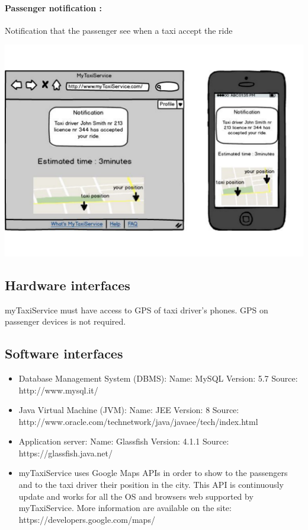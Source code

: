 \paragraph{Passenger notification :}
Notification that the passenger see when a taxi accept the ride
\begin{center}
	\includegraphics[width=\textwidth]{mockup/PassengerNotification.pdf}
\end{center}

\subsection{Hardware interfaces}
myTaxiService must have access to GPS of taxi driver's phones. GPS on passenger devices is not required.
\subsection{Software interfaces}
\begin{itemize}
	\item Database Management System (DBMS): \newline
	Name: MySQL \newline
	Version: 5.7 \newline
	Source: http://www.mysql.it/ 
	\item Java Virtual Machine (JVM):\newline
	Name: JEE \newline
	Version: 8 \newline
	Source: http://www.oracle.com/technetwork/java/javaee/tech/index.html
	\item Application server: \newline
	Name: Glassfish \newline
	Version: 4.1.1 \newline
	Source: https://glassfish.java.net/
	\item myTaxiService uses Google Maps APIs in order to show to the passengers and to the taxi driver their position in the city.
	This API is continuously update and works for all the OS and browsers web supported by myTaxiService.
	More information are available on the site: https://developers.google.com/maps/
\end{itemize}
